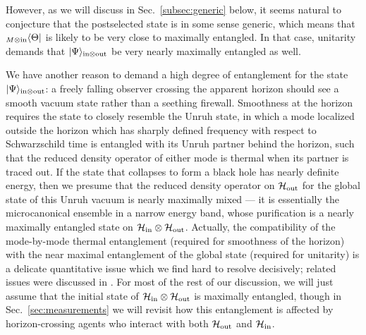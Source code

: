 \documentclass[11pt]{article}
\begin{document}
However, as we will discuss in Sec.~\ref{subsec:generic} below, it seems natural to conjecture that the postselected state is in some sense generic, which means that ${}_{M\otimes{\rm in}}\langle \Theta|$ is likely to be very close to maximally entangled. In that case, unitarity demands that $|\Psi\rangle_{{\rm in}\otimes {\rm out}}$ be very nearly maximally entangled as well.

We have another reason to demand a high degree of entanglement for the state $|\Psi\rangle_{{\rm in}\otimes {\rm out}}$: a freely falling observer crossing the apparent horizon should see a smooth vacuum state rather than a seething firewall. Smoothness at the horizon requires the state to closely resemble the Unruh state, in which a mode localized outside the horizon which has sharply defined frequency with respect to Schwarzschild time is entangled with its Unruh partner behind the horizon, such that the reduced density operator of either mode is thermal when its partner is traced out. If the state that collapses to form a black hole has nearly definite energy, then we presume that the reduced density operator on  $\mathcal{H}_{\rm out}$ for the global state of this Unruh vacuum is nearly maximally mixed --- it is essentially the microcanonical ensemble in a narrow energy band, whose purification is a nearly maximally entangled state on $\mathcal{H}_{\rm in}\otimes \mathcal{H}_{\rm out}$. Actually, the compatibility of the mode-by-mode thermal entanglement (required for smoothness of the horizon) with the near maximal entanglement of the global state (required for unitarity) is a delicate quantitative issue which we find hard to resolve decisively; related issues were discussed in \cite{marolf}. For most of the rest of our discussion, we will just assume that the initial state of $\mathcal{H}_{\rm in}\otimes \mathcal{H}_{\rm out}$ is maximally entangled, though in Sec.~\ref{sec:measurements} we will revisit how this entanglement is affected by horizon-crossing agents who interact with both $\mathcal{H}_{\rm out}$ and $\mathcal{H}_{\rm in}$.
\end{document}
